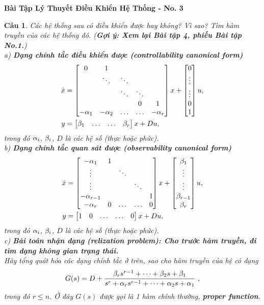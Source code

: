 \documentclass[11pt]{article}
\newtheorem{bt}{Câu}
\begin{document}



\begin{center}
	{\bf Bài Tập Lý Thuyết Điều Khiển Hệ Thống - No. 3}
\end{center}

\begin{bt} Các hệ thống sau có điều khiển được hay không? Vì sao? Tìm hàm truyền của các hệ thống đó. (\textbf{Gợi ý: Xem lại Bài tập 4, phiếu Bài tập No.1.}) \\
a) \textbf{Dạng chính tắc điều khiển được (controllability canonical form)}
%
\begin{align}
	\dot{x} &= \begin{bmatrix} 0 & 1 & &  & \\ &  \ddots & \ddots &  & \\ & & \ddots & \ddots &   \\&  &  & 0 & 1 \\ -\alpha_1 & -\alpha_2 & \dots & \dots & -\alpha_{r}  \end{bmatrix} x + \begin{bmatrix} 0 \\ \vdots \\ \vdots \\ 0 \\ 1 \end{bmatrix} u, \\
y &= \begin{bmatrix} \beta_1 &  \dots & \dots & \beta_r \end{bmatrix} x + D u, 
\end{align}
%
trong đó $\alpha_i$, $\beta_i$, $D$ là các hệ số (thực hoặc phức). \\
b) \textbf{Dạng chính tắc quan sát được (observability canonical form)}
%
\begin{align}
	\dot{x} &= \begin{bmatrix} -\alpha_1 & 1 & &  & \\ \vdots &   & \ddots &  & \\ \vdots & & & \ddots &   \\ -\alpha_{r-1} &  &  &  & 1 \\ -\alpha_{r} & 0 & \dots & \dots & 0 \end{bmatrix} x + \begin{bmatrix} \beta_1 \\  \vdots \\ \vdots \\ \beta_{r-1} \\ \beta_r \end{bmatrix} u, \\
y &= \begin{bmatrix} 1 &  0 & \dots & \dots & 0 \end{bmatrix} x + D u, 
\end{align}
%
trong đó $\alpha_i$, $\beta_i$, $D$ là các hệ số (thực hoặc phức). \\
c) \textbf{Bài toán nhận dạng (relization problem): Cho trước hàm truyền, đi tìm dạng không gian trạng thái.} \\
Hãy tổng quát hóa các dạng chính tắc ở trên, sao cho hàm truyền của hệ có dạng 
%
\begin{equation}
	G(s) = D + \dfrac{\b_r s^{r-1} + \dots + \b_2 s + \b_1}{s^r + \a_r s^{r-1} + \dots + \a_{2} s + \a_1} \ ,
\end{equation}
%
trong đó $r \leq n$. Ở đây $G(s)$ được gọi là 1 hàm chính thường, \textbf{proper function}.
\end{bt}
\end{document}
